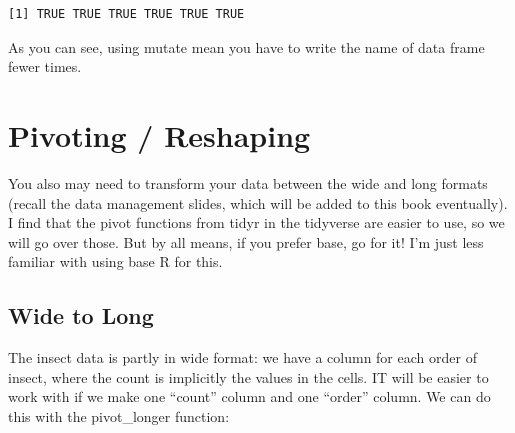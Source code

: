 \documentclass[
  letterpaper,
  DIV=11,
  numbers=noendperiod]{scrreprt}
\newenvironment{Shaded}{\begin{snugshade}}{\end{snugshade}}
\newcommand{\AttributeTok}[1]{\textcolor[rgb]{0.40,0.45,0.13}{#1}}
\newcommand{\DecValTok}[1]{\textcolor[rgb]{0.68,0.00,0.00}{#1}}
\newcommand{\DocumentationTok}[1]{\textcolor[rgb]{0.37,0.37,0.37}{\textit{#1}}}
\newcommand{\FunctionTok}[1]{\textcolor[rgb]{0.28,0.35,0.67}{#1}}
\newcommand{\NormalTok}[1]{\textcolor[rgb]{0.00,0.23,0.31}{#1}}
\newcommand{\OtherTok}[1]{\textcolor[rgb]{0.00,0.23,0.31}{#1}}
\newcommand{\SpecialCharTok}[1]{\textcolor[rgb]{0.37,0.37,0.37}{#1}}
\begin{document}
\begin{Shaded}
\end{Shaded}

\begin{verbatim}
[1] TRUE TRUE TRUE TRUE TRUE TRUE
\end{verbatim}

As you can see, using mutate mean you have to write the name of data
frame fewer times.

\hypertarget{pivoting-reshaping}{%
\section{Pivoting / Reshaping}\label{pivoting-reshaping}}

You also may need to transform your data between the wide and long
formats (recall the data management slides, which will be added to this
book eventually). I find that the pivot functions from tidyr in the
tidyverse are easier to use, so we will go over those. But by all means,
if you prefer base, go for it! I'm just less familiar with using base R
for this.

\hypertarget{wide-to-long}{%
\subsection{Wide to Long}\label{wide-to-long}}

The insect data is partly in wide format: we have a column for each
order of insect, where the count is implicitly the values in the cells.
IT will be easier to work with if we make one ``count'' column and one
``order'' column. We can do this with the pivot\_longer function:
\end{document}
